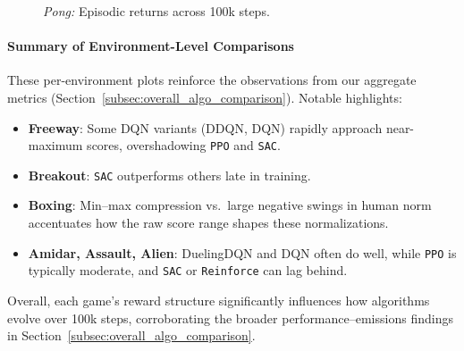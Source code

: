 \begin{figure} 
	\centering
	\quad
	\caption{\emph{Pong:} Episodic returns across 100k steps.}
	\label{fig:pong_comparison_combined}
\end{figure}

\paragraph{Summary of Environment-Level Comparisons}
These per-environment plots reinforce the observations from our aggregate metrics 
(Section~\ref{subsec:overall_algo_comparison}). 
Notable highlights:
\begin{itemize}
	\item \textbf{Freeway}: Some DQN variants (DDQN, DQN) rapidly approach near-maximum 
	scores, overshadowing \texttt{PPO} and \texttt{SAC}.
	\item \textbf{Breakout}: \texttt{SAC} outperforms others late in training.
	\item \textbf{Boxing}: Min--max compression vs.\ large negative swings in human norm 
	accentuates how the raw score range shapes these normalizations.
	\item \textbf{Amidar, Assault, Alien}: DuelingDQN and DQN often do well, 
	while \texttt{PPO} is typically moderate, and \texttt{SAC} or \texttt{Reinforce} 
	can lag behind.
\end{itemize}
Overall, each game’s reward structure significantly influences how algorithms evolve 
over 100k steps, corroborating the broader performance–emissions findings in 
Section~\ref{subsec:overall_algo_comparison}.

